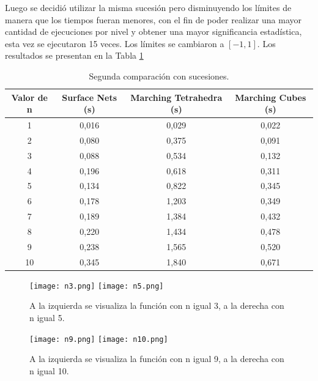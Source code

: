 \documentclass[12pt]{article}
\begin{document}
Luego se decidió utilizar la misma sucesión pero disminuyendo los límites de manera que los tiempos fueran menores, con el fin de poder realizar una mayor cantidad de ejecuciones por nivel y obtener una mayor significancia estadística, esta vez se ejecutaron 15 veces. Los límites se cambiaron a $[-1,1]$. Los resultados se presentan en la Tabla \ref{suc2} \\
\begin{table}[h!]
  \centering
  \begin{tabular}{cccc}
    \toprule
    Valor de n & Surface Nets (s) & Marching Tetrahedra (s) & Marching Cubes (s)\\
    \midrule
    1 & 0,016 & 0,029 & 0,022\\
    2 & 0,080 & 0,375 & 0,091\\
    3 & 0,088 & 0,534 & 0,132\\
    4 & 0,196 & 0,618 & 0,311\\
    5 & 0,134 & 0,822 & 0,345\\
    6 & 0,178 & 1,203 & 0,349\\
    7 & 0,189 & 1,384 & 0,432\\
    8 & 0,220 & 1,434 & 0,478\\
    9 & 0,238 & 1,565 & 0,520\\
    10 & 0,345 & 1,840 & 0,671\\
    \bottomrule
  \end{tabular}
  \caption{Segunda comparación con sucesiones.}
  \label{suc2}
\end{table}
\begin{figure}[h!]
\texttt{[image: n3.png]}
\hfill
\texttt{[image: n5.png]}
\caption{ A la izquierda se visualiza la función con n igual 3, a la derecha con n igual 5.}
\label{ejsuc1}
\end{figure}
\begin{figure}[h!]
\texttt{[image: n9.png]}
\hfill
\texttt{[image: n10.png]}
\caption{ A la izquierda se visualiza la función con n igual 9, a la derecha con n igual 10.}
\label{ejsuc2}
\end{figure}
\end{document}
